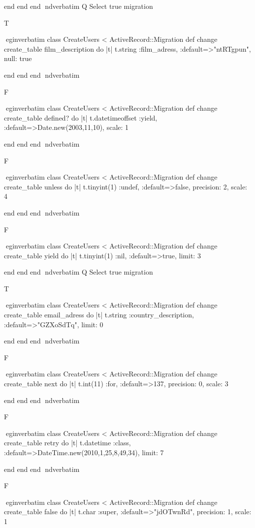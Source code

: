     end 
  end 
end
nd{verbatim}
Q
 Select true migration

T

egin{verbatim}
 class CreateUsers < ActiveRecord::Migration 
  def change 
    create_table film_description do |t| 
      t.string :film_adress, :default=>"ntRTgpun", null: true
    
    end 
  end 
end
nd{verbatim}

F

egin{verbatim}
 class CreateUsers < ActiveRecord::Migration 
  def change 
    create_table defined? do |t| 
      t.datetimeoffset :yield, :default=>Date.new(2003,11,10), scale: 1
    
    end 
  end 
end
nd{verbatim}

F

egin{verbatim}
 class CreateUsers < ActiveRecord::Migration 
  def change 
    create_table unless do |t| 
      t.tinyint(1) :undef, :default=>false, precision: 2, scale: 4
    
    end 
  end 
end
nd{verbatim}

F

egin{verbatim}
 class CreateUsers < ActiveRecord::Migration 
  def change 
    create_table yield do |t| 
      t.tinyint(1) :nil, :default=>true, limit: 3
    
    end 
  end 
end
nd{verbatim}
Q
 Select true migration

T

egin{verbatim}
 class CreateUsers < ActiveRecord::Migration 
  def change 
    create_table email_adress do |t| 
      t.string :country_description, :default=>"GZXoSdTq", limit: 0
    
    end 
  end 
end
nd{verbatim}

F

egin{verbatim}
 class CreateUsers < ActiveRecord::Migration 
  def change 
    create_table next do |t| 
      t.int(11) :for, :default=>137, precision: 0, scale: 3
    
    end 
  end 
end
nd{verbatim}

F

egin{verbatim}
 class CreateUsers < ActiveRecord::Migration 
  def change 
    create_table retry do |t| 
      t.datetime :class, :default=>DateTime.new(2010,1,25,8,49,34), limit: 7
    
    end 
  end 
end
nd{verbatim}

F

egin{verbatim}
 class CreateUsers < ActiveRecord::Migration 
  def change 
    create_table false do |t| 
      t.char :super, :default=>"jdOTwnRd", precision: 1, scale: 1
    
